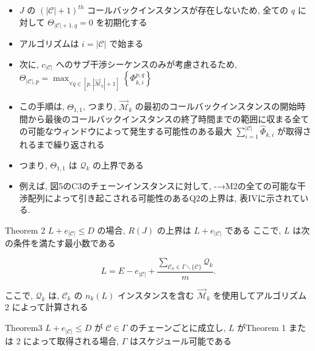 \begin{frame}{}
    \begin{itemize}
        \item $J$ の $(|\mathcal{C}|+1)^{t h}$ コールバックインスタンスが存在しないため, 全ての $q$ に対して $\Theta_{|\mathcal{C}|+1, q}=0$ を初期化する
        \item アルゴリズムは $i=|\mathcal{C}|$ で始まる
        \item 次に, $c_{|\mathcal{C}|}$ へのサブ干渉シーケンスのみが考慮されるため, $\Theta_{|\mathcal{C}|, p}=\max _{\forall q \in\left[p,\left|\overrightarrow{\mathcal{M}}_{k}\right|+1\right]}\left\{\Phi_{k, i}^{p, q}\right\}$
        \item この手順は, $\Theta_{1,1}$, つまり, $\overrightarrow{\mathcal{M}}_{k}$ の最初のコールバックインスタンスの開始時間から最後のコールバックインスタンスの終了時間までの範囲に収まる全ての可能なウィンドウによって発生する可能性のある最大 $\sum_{i=1}^{|\mathcal{C}|} \hat{\Phi}_{k, i}$ が取得されるまで繰り返される
        \item つまり, $\Theta_{1,1}$ は $\mathcal{Q}_{k}$ の上界である
    \end{itemize}
\end{frame}

\begin{frame}{}
    \begin{itemize}
        \item 例えば, 図5のC3のチェーンインスタンスに対して, -→M2の全ての可能な干渉配列によって引き起こされる可能性のあるQ2の上界は, 表IVに示されている.
    \end{itemize}
\end{frame}

\begin{frame}{Theorem 2}
    $L+e_{|\mathcal{C}|} \leq D$ の場合, $R(J)$ の上界は $L+e_{|\mathcal{C}|}$ である
    ここで, $L$ は次の条件を満たす最小数である

    \begin{equation*}
        L=E-e_{|\mathcal{C}|}+\frac{\sum_{\mathcal{C}_{k} \in \Gamma \backslash\{\mathcal{C}\}} \mathcal{Q}_{k}}{m} .
    \end{equation*}

    ここで, $\mathcal{Q}_{k}$ は, $\mathcal{C}_{k}$ の $n_{k}(L)$ インスタンスを含む $\overrightarrow{\mathcal{M}}_{k}$ を使用してアルゴリズム 2 によって計算される
\end{frame}

\begin{frame}{Theorem3}
    $L+e_{|\mathcal{C}|} \leq D$ が $\mathcal{C} \in \Gamma$ のチェーンごとに成立し, $L$ がTheorem 1 または 2 によって取得される場合, $\Gamma$ はスケジュール可能である
\end{frame}

